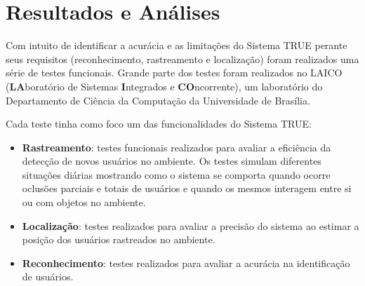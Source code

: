 \chapter{Resultados e Análises}
\label{cap:testes}


	Com intuito de identificar a acurácia e as limitações do Sistema TRUE perante
	seus requisitos (reconhecimento, rastreamento e localização) foram realizados
	uma série de testes funcionais. Grande parte dos testes foram realizados no LAICO
	(\textbf{LA}boratório de Sistemas \textbf{I}ntegrados e \textbf{CO}ncorrente),
	um laboratório do Departamento de Ciência da Computação da Universidade de
	Brasília.



	Cada teste tinha como foco um das funcionalidades do Sistema TRUE:

	\begin{itemize}
		\item \textbf{Rastreamento}: testes funcionais realizados para avaliar a
		eficiência da detecção de novos usuários no ambiente. Os testes simulam
		diferentes situações diárias mostrando como o sistema se comporta quando
		ocorre oclusões parciais e totais de usuários e quando os mesmos interagem
		entre si ou com objetos no ambiente.

		\item \textbf{Localização}: testes realizados para avaliar a precisão do
		sistema ao estimar a posição dos usuários rastreados no ambiente.
		
		\item \textbf{Reconhecimento}: testes realizados para avaliar a acurácia na
		identificação de usuários.
	\end{itemize}

